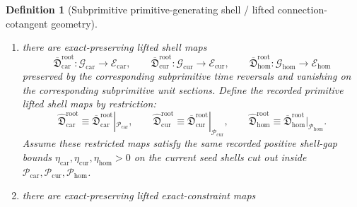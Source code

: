 \documentclass[11pt]{article}
\newcommand{\TensorShellTarget}{\mathcal E_{\mathrm{car}}}
\newcommand{\CurShellTarget}{\mathcal E_{\mathrm{cur}}}
\newcommand{\HomShellTarget}{\mathcal E_{\mathrm{hom}}}
\newcommand{\TensorShellGap}{\eta_{\mathrm{car}}}
\newcommand{\CurShellGap}{\eta_{\mathrm{cur}}}
\newcommand{\HomShellGap}{\eta_{\mathrm{hom}}}
\newcommand{\TensorOriginTarget}{\mathcal H_{\mathrm{car}}^{\mathrm{orig}}}
\newcommand{\CurOriginTarget}{\mathcal H_{\mathrm{cur}}^{\mathrm{orig}}}
\newcommand{\HomOriginTarget}{\mathcal H_{\mathrm{hom}}^{\mathrm{orig}}}
\newcommand{\TensorOriginGap}{\epsilon_{\mathrm{car}}^{\mathrm{orig}}}
\newcommand{\CurOriginGap}{\epsilon_{\mathrm{cur}}^{\mathrm{orig}}}
\newcommand{\HomOriginGap}{\epsilon_{\mathrm{hom}}^{\mathrm{orig}}}
\newcommand{\TensorPrimitiveSpace}{\mathcal P_{\mathrm{car}}}
\newcommand{\CurPrimitiveSpace}{\mathcal P_{\mathrm{cur}}}
\newcommand{\HomPrimitiveSpace}{\mathcal P_{\mathrm{hom}}}
\newcommand{\TensorPrimitiveLiftedAmbientSection}{\widehat{\mathfrak S}_{\mathrm{car}}^{\mathrm{orig}}}
\newcommand{\CurPrimitiveLiftedAmbientSection}{\widehat{\mathfrak S}_{\mathrm{cur}}^{\mathrm{orig}}}
\newcommand{\HomPrimitiveLiftedAmbientSection}{\widehat{\mathfrak S}_{\mathrm{hom}}^{\mathrm{orig}}}
\newcommand{\TensorPrimitiveLiftedShellSection}{\widehat{\mathfrak D}_{\mathrm{car}}^{\mathrm{root}}}
\newcommand{\CurPrimitiveLiftedShellSection}{\widehat{\mathfrak D}_{\mathrm{cur}}^{\mathrm{root}}}
\newcommand{\HomPrimitiveLiftedShellSection}{\widehat{\mathfrak D}_{\mathrm{hom}}^{\mathrm{root}}}
\newcommand{\TensorSubprimitiveSpace}{\mathcal G_{\mathrm{car}}}
\newcommand{\CurSubprimitiveSpace}{\mathcal G_{\mathrm{cur}}}
\newcommand{\HomSubprimitiveSpace}{\mathcal G_{\mathrm{hom}}}
\newcommand{\TensorSubprimitiveLiftedAmbientSection}{\overline{\mathfrak S}_{\mathrm{car}}^{\mathrm{orig}}}
\newcommand{\CurSubprimitiveLiftedAmbientSection}{\overline{\mathfrak S}_{\mathrm{cur}}^{\mathrm{orig}}}
\newcommand{\HomSubprimitiveLiftedAmbientSection}{\overline{\mathfrak S}_{\mathrm{hom}}^{\mathrm{orig}}}
\newcommand{\TensorSubprimitiveLiftedShellSection}{\overline{\mathfrak D}_{\mathrm{car}}^{\mathrm{root}}}
\newcommand{\CurSubprimitiveLiftedShellSection}{\overline{\mathfrak D}_{\mathrm{cur}}^{\mathrm{root}}}
\newcommand{\HomSubprimitiveLiftedShellSection}{\overline{\mathfrak D}_{\mathrm{hom}}^{\mathrm{root}}}
\newtheorem{definition}{Definition}
\begin{document}
\begin{definition}[Subprimitive primitive-generating shell / lifted connection-cotangent geometry]
\begin{enumerate}
    \[
    \TensorSubprimitiveLiftedAmbientSection:\TensorSubprimitiveSpace\to\TensorOriginTarget,\qquad
    \CurSubprimitiveLiftedAmbientSection:\CurSubprimitiveSpace\to\CurOriginTarget,\qquad
    \HomSubprimitiveLiftedAmbientSection:\HomSubprimitiveSpace\to\HomOriginTarget
    \]
    preserved by the corresponding subprimitive time reversals and vanishing on the corresponding subprimitive unit sections. Define the recorded primitive lifted ambient-generating shell maps by restriction:
    \begin{equation}
    \TensorPrimitiveLiftedAmbientSection\equiv\TensorSubprimitiveLiftedAmbientSection|_{\TensorPrimitiveSpace},\qquad
    \CurPrimitiveLiftedAmbientSection\equiv\CurSubprimitiveLiftedAmbientSection|_{\CurPrimitiveSpace},\qquad
    \HomPrimitiveLiftedAmbientSection\equiv\HomSubprimitiveLiftedAmbientSection|_{\HomPrimitiveSpace}.
    \label{eq:primitive_ambient_from_subprimitive}
    \end{equation}
    Assume these restricted maps satisfy the same recorded positive ambient-generating gap bounds \(\TensorOriginGap,\CurOriginGap,\HomOriginGap>0\) on the current ambient shells cut out inside \(\TensorPrimitiveSpace,\CurPrimitiveSpace,\HomPrimitiveSpace\).
    \item there are exact-preserving lifted shell maps
    \[
    \TensorSubprimitiveLiftedShellSection:\TensorSubprimitiveSpace\to\TensorShellTarget,\qquad
    \CurSubprimitiveLiftedShellSection:\CurSubprimitiveSpace\to\CurShellTarget,\qquad
    \HomSubprimitiveLiftedShellSection:\HomSubprimitiveSpace\to\HomShellTarget
    \]
    preserved by the corresponding subprimitive time reversals and vanishing on the corresponding subprimitive unit sections. Define the recorded primitive lifted shell maps by restriction:
    \begin{equation}
    \TensorPrimitiveLiftedShellSection\equiv\TensorSubprimitiveLiftedShellSection|_{\TensorPrimitiveSpace},\qquad
    \CurPrimitiveLiftedShellSection\equiv\CurSubprimitiveLiftedShellSection|_{\CurPrimitiveSpace},\qquad
    \HomPrimitiveLiftedShellSection\equiv\HomSubprimitiveLiftedShellSection|_{\HomPrimitiveSpace}.
    \label{eq:primitive_shell_from_subprimitive}
    \end{equation}
    Assume these restricted maps satisfy the same recorded positive shell-gap bounds \(\TensorShellGap,\CurShellGap,\HomShellGap>0\) on the current seed shells cut out inside \(\TensorPrimitiveSpace,\CurPrimitiveSpace,\HomPrimitiveSpace\).
    \item there are exact-preserving lifted exact-constraint maps

\end{enumerate}
\end{definition}
\end{document}
